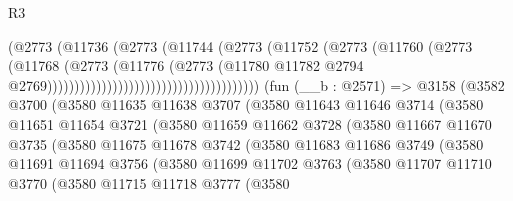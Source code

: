 \begin{lexlean}{R3}
\begin{coremodule}
                                                      (@2773
                                                        (@11736
                                                          (@2773
                                                            (@11744
                                                              (@2773
                                                                (@11752
                                                                  (@2773
                                                                    (@11760
                                                                      (@2773
                                                                        (@11768
                                                                          (@2773
                                                                            (@11776
                                                                              (@2773
                                                                                (@11780
                                                                                  @11782
                                                                                  @2794
                                                                                  @2769)))))))))))))))))))))))))))))))))))))))
    (fun (__b : @2571) =>
    @3158
      (@3582
        @3700
        (@3580
          @11635
          @11638
          @3707
          (@3580
            @11643
            @11646
            @3714
            (@3580
              @11651
              @11654
              @3721
              (@3580
                @11659
                @11662
                @3728
                (@3580
                  @11667
                  @11670
                  @3735
                  (@3580
                    @11675
                    @11678
                    @3742
                    (@3580
                      @11683
                      @11686
                      @3749
                      (@3580
                        @11691
                        @11694
                        @3756
                        (@3580
                          @11699
                          @11702
                          @3763
                          (@3580
                            @11707
                            @11710
                            @3770
                            (@3580
                              @11715
                              @11718
                              @3777
                              (@3580

\end{coremodule}
\end{lexlean}
